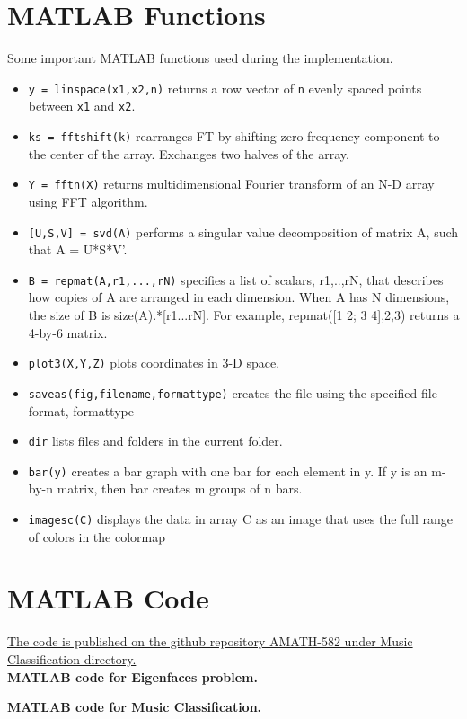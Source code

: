 \documentclass{article}
\begin{document}
\pagebreak
\begin{appendices}

\section{MATLAB Functions}
Some important MATLAB functions used during the implementation.
\begin{itemize}
\item \texttt{y = linspace(x1,x2,n)} returns a row vector of \texttt{n} evenly spaced points between \texttt{x1} and \texttt{x2}. 
\item \texttt{ks = fftshift(k)} rearranges FT by shifting zero frequency component to the center of the array. Exchanges two halves of the array.
\item \texttt{Y = fftn(X)} returns multidimensional Fourier transform of an N-D array using FFT algorithm.
\item \texttt{[U,S,V] = svd(A)} performs a singular value decomposition of matrix A, such that A = U*S*V'.
\item \texttt{B = repmat(A,r1,...,rN)} specifies a list of scalars, r1,..,rN, that describes how copies of A are arranged in each dimension. When A has N dimensions, the size of B is size(A).*[r1...rN]. For example, repmat([1 2; 3 4],2,3) returns a 4-by-6 matrix.
\item \texttt{plot3(X,Y,Z)} plots coordinates in 3-D space.
\item \texttt{saveas(fig,filename,formattype)} creates the file using the specified file format, formattype
\item \texttt{dir} lists files and folders in the current folder.
\item \texttt{bar(y)} creates a bar graph with one bar for each element in y. If y is an m-by-n matrix, then bar creates m groups of n bars.
\item \texttt{imagesc(C)} displays the data in array C as an image that uses the full range of colors in the colormap
\end{itemize}

\pagebreak

\section{MATLAB Code}
\href{https://github.com/cssubedi/AMATH-582}{The code is published on the github repository AMATH-582 under Music Classification directory.} \\

\textbf{MATLAB code for Eigenfaces problem.}


\pagebreak
\textbf{MATLAB code for Music Classification.}



\end{appendices}
\end{document}
